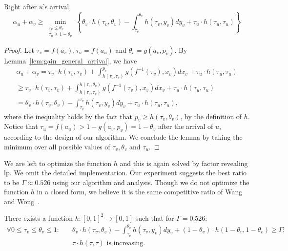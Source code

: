 \begin{lemma}
\label{lem:gain_general}
Right after $u$'s arrival,
\[
\alpha_u + \alpha_v \ge \min_{\substack{\tau_v \le \theta_v \\ \tau_u \ge 1-\theta_v}} \left\{ \theta_v \cdot h(\tau_v, \theta_v) - \int_{\tau_v}^{\theta_v} h(\tau_v, y_v) dy_v + \tau_u \cdot h(\tau_u,\tau_u) \right\}
\]
\end{lemma}
\begin{proof}
Let $\tau_v = f(a_v), \tau_u = f(a_u)$ and $\theta_v = g(a_v, p_v)$. By Lemma~\ref{lem:gain_general_arrival}, we have 
\begin{multline*}
	\alpha_u + \alpha_v = \tau_v \cdot h(\tau_v, \tau_v) + \int_{h(\tau_v,\tau_v)}^{p_v} g(f^{-1}(\tau_v), x_v) dx_v + \tau_u \cdot h(\tau_u,\tau_u) \\
	\ge \tau_v \cdot h(\tau_v, \tau_v) + \int_{h(\tau_v,\tau_v)}^{h(\tau_v, \theta_v)} g(f^{-1}(\tau_v), x_v) dx_v + \tau_u \cdot h(\tau_u,\tau_u) \\
	= \theta_v \cdot h(\tau_v, \theta_v) - \int_{\tau_v}^{\tau_v} h(\tau_v, y_v) dy_v + \tau_u \cdot h(\tau_u, \tau_u),
\end{multline*}
where the inequality holds by the fact that $p_v \ge h(\tau_v,\theta_v)$, by the definition of $h$.
Notice that $\tau_u =f(a_u) > 1-g(a_v,p_v) = 1- \theta_v$ after the arrival of $u$, according to the design of our algorithm. We conclude the lemma by taking the minimum over all possible values of $\tau_v, \theta_v$ and $\tau_u$.
\end{proof}

We are left to optimize the function $h$ and this is again solved by factor revealing lp. We omit the detailed implementation. 
Our experiment suggests the best ratio to be $\Gamma\approx 0.526$ using our algorithm and analysis. Though we do not optimize the function $h$ in a closed form, we believe it is the same competitive ratio of Wang and Wong~\cite{icalp/WangW15}.
\begin{lemma}
\label{lem:opth_general_arrival}
There exists a function $h:[0,1]^2 \to [0,1]$ such that for $\Gamma = 0.526$:
\begin{align*}
	\forall 0\le \tau_v \le \theta_v \le 1:\quad  & \theta_v \cdot h(\tau_v, \theta_v) - \int_{\tau_v}^{\theta_v} h(\tau_v, y_v) dy_v + (1-\theta_v) \cdot h(1-\theta_v, 1-\theta_v) \ge \Gamma;\\
	& \tau \cdot h(\tau, \tau) \text{ is increasing.}
\end{align*} 
\end{lemma}

